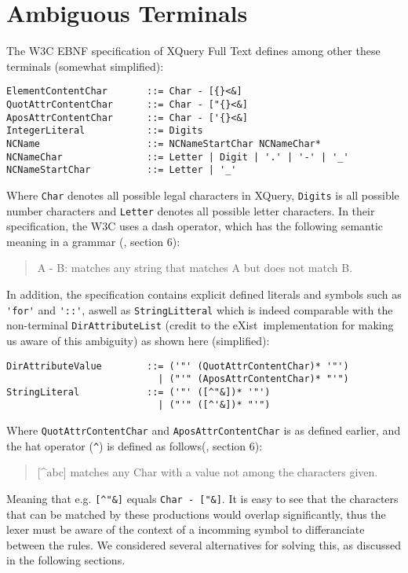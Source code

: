 \section{Ambiguous Terminals}
\label{sect:ambiguousgrammar:ambigTerm}
The W3C EBNF specification of XQuery Full Text\cite{w3c01} defines among other these terminals (somewhat simplified):
\begin{Verbatim}
ElementContentChar       ::= Char - [{}<&]
QuotAttrContentChar      ::= Char - ["{}<&]
AposAttrContentChar      ::= Char - ['{}<&]
IntegerLiteral           ::= Digits
NCName                   ::= NCNameStartChar NCNameChar*
NCNameChar               ::= Letter | Digit | '.' | '-' | '_'
NCNameStartChar          ::= Letter | '_'
\end{Verbatim}
Where \verb!Char! denotes all possible legal characters in XQuery, \verb!Digits! is all possible number characters and \verb!Letter! denotes all possible letter characters. In their specification, the W3C uses a dash operator, which has the following
semantic meaning in a grammar (\cite{w3c03}, section 6):
\begin{quote}
A - B: matches any string that matches A but does not match B.
\end{quote}
In addition, the specification contains explicit defined literals and symbols such as \verb!'for'! and \verb!'::'!, aswell as \verb!StringLitteral! which is indeed comparable with the non-terminal \verb!DirAttributeList! (credit to the eXist\cite{exist_doc}~implementation for making us aware of this ambiguity) as shown here (simplified):
\begin{Verbatim}
DirAttributeValue        ::= ('"' (QuotAttrContentChar)* '"')
                           | ("'" (AposAttrContentChar)* "'")
StringLiteral            ::= ('"' ([^"&])* '"') 
                           | ("'" ([^'&])* "'")
\end{Verbatim}
Where \verb!QuotAttrContentChar! and \verb!AposAttrContentChar! is as defined earlier, and the hat operator (\verb!^!) is defined as follows(\cite{w3c03}, section 6):
\begin{quote}
[\^{}abc] matches any Char with a value not among the characters given.
\end{quote}
Meaning that e.g. \verb![^"&]! equals \verb!Char - ["&]!. It is easy to see that the characters that can be matched by these productions would overlap significantly, thus the lexer must be aware of the context of a incomming symbol to differanciate between the rules. We considered several alternatives for solving this, as discussed in the following sections.

